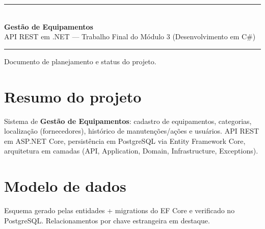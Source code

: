 \documentclass[11pt,a4paper]{article}
\begin{document}
\thispagestyle{empty}
\vspace*{1cm}
{\color{rulegray}\rule{\textwidth}{0.6pt}}\\[10pt]
{\color{headgray}\fontsize{26}{30}\selectfont\bfseries Gestão de Equipamentos}\\[6pt]
{\color{accent}\large API REST em .NET --- Trabalho Final do Módulo 3 (Desenvolvimento em C\#)}\\[10pt]
{\color{rulegray}\rule{\textwidth}{0.6pt}}

\vspace{4pt}
{\color{accent}\small Documento de planejamento e status do projeto.}

\vspace{18pt}

\section{Resumo do projeto}

Sistema de \textbf{Gestão de Equipamentos}: cadastro de equipamentos, categorias,
localização (fornecedores), histórico de manutenções/ações e usuários. API REST em
ASP.NET Core, persistência em PostgreSQL via Entity Framework Core, arquitetura em
camadas (API, Application, Domain, Infrastructure, Exceptions).

\section{Modelo de dados}

Esquema gerado pelas entidades + migrations do EF Core e verificado no PostgreSQL.
Relacionamentos por chave estrangeira em destaque.
\end{document}

